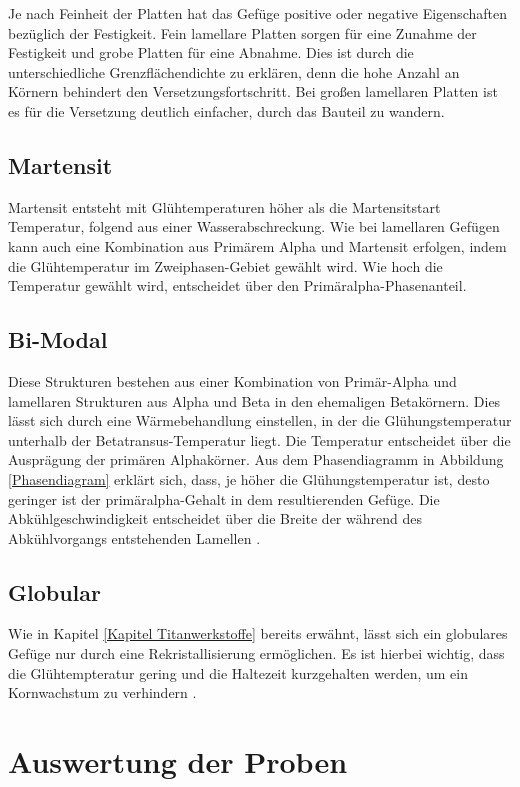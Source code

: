 \documentclass[a4paper, 11pt]{tubsreprt}
\begin{document}
Je nach Feinheit der Platten hat das Gefüge positive oder negative Eigenschaften bezüglich der Festigkeit. Fein lamellare Platten sorgen für eine Zunahme der Festigkeit und grobe Platten für eine Abnahme. Dies ist durch die unterschiedliche Grenzflächendichte zu erklären, denn die hohe Anzahl an Körnern behindert den Versetzungsfortschritt. Bei großen lamellaren Platten ist es für die Versetzung deutlich einfacher, durch das Bauteil zu wandern. 
\newpage
\subsection{Martensit}
Martensit entsteht mit Glühtemperaturen höher als die Martensitstart  Temperatur, folgend aus einer Wasserabschreckung. Wie bei lamellaren Gefügen kann auch eine Kombination aus Primärem Alpha und Martensit erfolgen, indem die Glühtemperatur im Zweiphasen-Gebiet gewählt wird. Wie hoch die Temperatur gewählt wird, entscheidet über den Primäralpha-Phasenanteil.

\subsection{Bi-Modal}
Diese Strukturen bestehen aus einer Kombination von Primär-Alpha und lamellaren Strukturen aus Alpha und Beta in den ehemaligen Betakörnern. Dies lässt sich durch eine Wärmebehandlung einstellen, in der die Glühungstemperatur unterhalb der Betatransus-Temperatur liegt. Die Temperatur entscheidet über die Ausprägung der primären Alphakörner. Aus dem Phasendiagramm in Abbildung \ref{Phasendiagram} erklärt sich, dass, je höher die Glühungstemperatur ist, desto geringer ist der primäralpha-Gehalt in dem resultierenden Gefüge. Die Abkühlgeschwindigkeit entscheidet über die Breite der während des Abkühlvorgangs entstehenden Lamellen \cite{Luetjering2007}.

\subsection{Globular}
Wie in Kapitel \ref{Kapitel Titanwerkstoffe} bereits erwähnt, lässt sich ein globulares Gefüge nur durch eine Rekristallisierung ermöglichen. Es ist hierbei wichtig, dass die Glühtempteratur gering und die Haltezeit kurzgehalten werden, um ein Kornwachstum zu verhindern \cite{Luetjering2007}.



\section{Auswertung der Proben}
\end{document}
